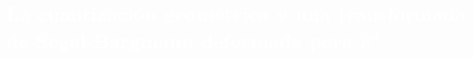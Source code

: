 \begin{titlepage}
\author{%
\\
    John Beiro Moreno Barrios\\
    Universidad del atl\'antico\\
      \texttt{\footnotesize \hspace*{-1.2cm}johnmoreno@mail.uniatlantico.edu.co}\vspace{10pt}\\
         }
\newcommand{\N}{\mathbb{N}}
\newcommand{\R}{\mathbb{R}}
\newcommand{\Z}{\mathbb{Z}}
\newcommand{\Bd}{\mathrm{Bd}}
\newcommand{\Int}{\mathrm{Int}}
\newcommand{\diam}{\mathrm{diam}}
\newcommand{\Cl}{\mathrm{Cl}}
\newcommand{\A}{\mathrm{A}}

\pagecolor{white}
\BgThispage
{}
\vspace*{-1.1cm}
\noindent
\def\titulo#1{\section{#1}}
\section{\bf\large\textcolor{white}{La cuantizaci\'on geom\'etrica y una transformada de Segal-Bargmann deformada para $\R^{2}$}}
\vspace*{2cm}\par
\noindent


\end{titlepage}
